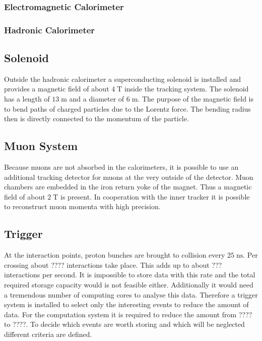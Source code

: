 \subsubsection{Electromagnetic Calorimeter}
\subsubsection{Hadronic Calorimeter}
	
\subsection{Solenoid}
	Outside the hadronic calorimeter a superconducting solenoid is installed and provides a magnetic field of about $4\;\text{T}$ inside the tracking system. The solenoid has a length of $13\;\text{m}$ and a diameter of $6\;\text{m}$. The purpose of the magnetic field is to bend paths of charged particles due to the Lorentz force. The bending radius then is directly connected to the momentum of the particle.  
\subsection{Muon System}
\label{sec:muonsystem}
	Because muons are not absorbed in the calorimeters, it is possible to use an additional tracking detector for muons at the very outside of the detector. Muon chambers are embedded in the iron return yoke of the magnet. Thus a magnetic field of about $2\;\text{T}$ is present.
	In cooperation with the inner tracker it is possible to reconstruct muon momenta with high precision.
\subsection{Trigger}
	At the interaction points, proton bunches are brought to collision every $25\;\text{ns}$. Per crossing about ????
	interactions take place. This adds up to about ???
	interactions per second. It is impossible to store data with this rate and the total required storage capacity would is not feasible either. Additionally it would need a tremendous number of computing cores to analyse this data. Therefore a trigger system is installed to select only the interesting events to reduce the amount of data. For the computation system it is required to reduce the amount from ???? to ????.
 	To decide which events are worth storing and which will be neglected different criteria are defined.
	
	